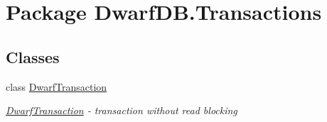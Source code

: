\hypertarget{namespace_dwarf_d_b_1_1_transactions}{\section{Package Dwarf\+D\+B.\+Transactions}
\label{namespace_dwarf_d_b_1_1_transactions}
}
\subsection*{Classes}
\begin{DoxyCompactItemize}
\item 
class \hyperlink{class_dwarf_d_b_1_1_transactions_1_1_dwarf_transaction}{Dwarf\+Transaction}
\begin{DoxyCompactList}\small\item\em \hyperlink{class_dwarf_d_b_1_1_transactions_1_1_dwarf_transaction}{Dwarf\+Transaction} -\/ transaction without read blocking \end{DoxyCompactList}\end{DoxyCompactItemize}
